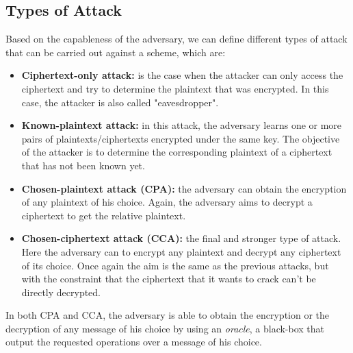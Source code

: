     \subsection{Types of Attack}
    Based on the capableness of the adversary, we can define different types of attack that can be carried out against a scheme, which are:
    \begin{itemize}
        \item{\textbf{Ciphertext-only attack:} is the case when the attacker can only access the ciphertext and try to determine the plaintext that was encrypted. In this case, the attacker is also called "eavesdropper".}
        \item{\textbf{Known-plaintext attack:} in this attack, the adversary learns one or more pairs of plaintexts/ciphertexts encrypted under the same key. The objective of the attacker is to determine the corresponding plaintext of a ciphertext that has not been known yet.}
        \item{\textbf{Chosen-plaintext attack (CPA):} the adversary can obtain the encryption of any plaintext of his choice. Again, the adversary aims to decrypt a ciphertext to get the relative plaintext.}
        \item{\textbf{Chosen-ciphertext attack (CCA):} the final and stronger type of attack. Here the adversary can to encrypt any plaintext and decrypt any ciphertext of its choice. Once again the aim is the same as the previous attacks, but with the constraint that the ciphertext that it wants to crack can't be directly decrypted.}
    \end{itemize}
In both CPA and CCA, the adversary is able to obtain the encryption or the decryption of any message of his choice by using an \emph{oracle}, a black-box that output the requested operations over a message of his choice.
